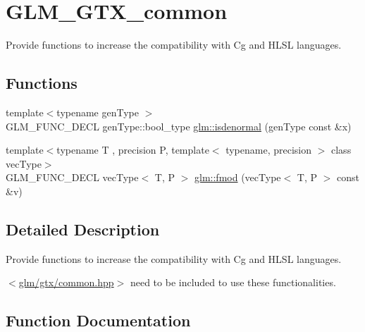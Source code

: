 \hypertarget{group__gtx__common}{}\section{G\+L\+M\+\_\+\+G\+T\+X\+\_\+common}
\label{group__gtx__common}


Provide functions to increase the compatibility with Cg and H\+L\+S\+L languages.  


\subsection*{Functions}
\begin{DoxyCompactItemize}
\item 
{\footnotesize template$<$typename gen\+Type $>$ }\\G\+L\+M\+\_\+\+F\+U\+N\+C\+\_\+\+D\+E\+C\+L gen\+Type\+::bool\+\_\+type \hyperlink{group__gtx__common_ga74aa7c7462245d83bd5a9edf9c6c2d91}{glm\+::isdenormal} (gen\+Type const \&x)
\item 
{\footnotesize template$<$typename T , precision P, template$<$ typename, precision $>$ class vec\+Type$>$ }\\G\+L\+M\+\_\+\+F\+U\+N\+C\+\_\+\+D\+E\+C\+L vec\+Type$<$ T, P $>$ \hyperlink{group__gtx__common_ga2580f50d4064557d62f4a533dfc6c7e3}{glm\+::fmod} (vec\+Type$<$ T, P $>$ const \&v)
\end{DoxyCompactItemize}


\subsection{Detailed Description}
Provide functions to increase the compatibility with Cg and H\+L\+S\+L languages. 

$<$\hyperlink{gtx_2common_8hpp}{glm/gtx/common.\+hpp}$>$ need to be included to use these functionalities. 

\subsection{Function Documentation}
\hypertarget{group__gtx__common_ga2580f50d4064557d62f4a533dfc6c7e3}{}
